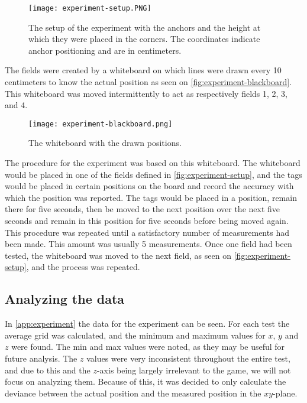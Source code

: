 \begin{figure}[H]
    \centering
    \texttt{[image: experiment-setup.PNG]}
    \caption{The setup of the experiment with the anchors and the height at which they were placed in the corners. The coordinates indicate anchor positioning and are in centimeters.}
    \label{fig:experiment-setup}
\end{figure}
\noindent
The fields were created by a whiteboard on which lines were drawn every 10 centimeters to know the actual position as seen on \autoref{fig:experiment-blackboard}.
This whiteboard was moved intermittently to act as respectively fields 1, 2, 3, and 4.

\begin{figure}[H]
    \centering
    \texttt{[image: experiment-blackboard.png]}
    \caption{The whiteboard with the drawn positions.}
    \label{fig:experiment-blackboard}
\end{figure}
\noindent
The procedure for the experiment was based on this whiteboard.
The whiteboard would be placed in one of the fields defined in \autoref{fig:experiment-setup}, and the tags would be placed in certain positions on the board and record the accuracy with which the position was reported.
The tags would be placed in a position, remain there for five seconds, then be moved to the next position over the next five seconds and remain in this position for five seconds before being moved again.
This procedure was repeated until a satisfactory number of measurements had been made.
This amount was usually 5 measurements.
Once one field had been tested, the whiteboard was moved to the next field, as seen on \autoref{fig:experiment-setup}, and the process was repeated.

\subsection{Analyzing the data}
In \autoref{app:experiment} the data for the experiment can be seen.
For each test the average grid was calculated, and the minimum and maximum values for $x$, $y$ and $z$ were found.
The min and max values were noted, as they may be useful for future analysis.
The $z$ values were very inconsistent throughout the entire test, and due to this and the $z$-axis being largely irrelevant to the game, we will not focus on analyzing them.
Because of this, it was decided to only calculate the deviance between the actual position and the measured position in the $xy$-plane.

